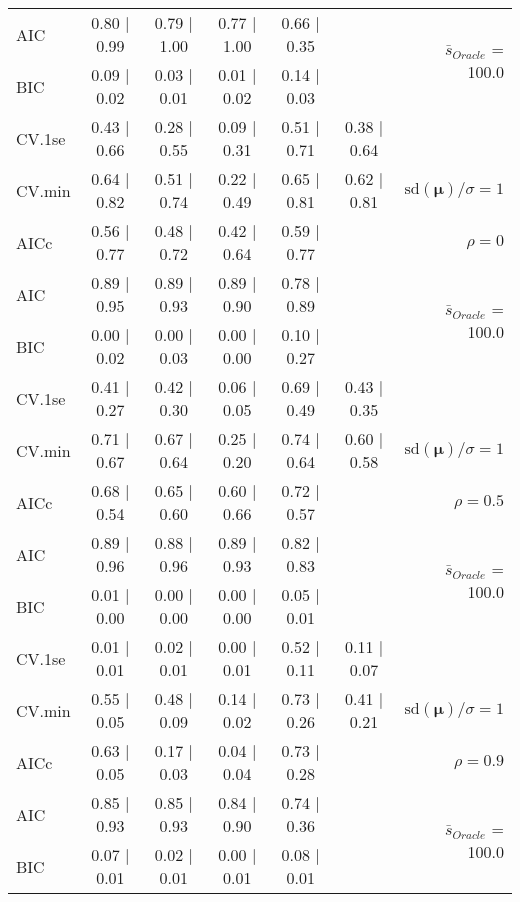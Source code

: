 \begin{table}
\begin{center}
\begin{tabular}{l*{5}{c}|r}
AIC & 0.80 $\mid$ 0.99 & 0.79 $\mid$ 1.00 & 0.77 $\mid$ 1.00 & 0.66 $\mid$ 0.35 & &  \multirow{2}{*}{$\bar{s}_{Oracle}$ = 100.0} \\
BIC & 0.09 $\mid$ 0.02 & 0.03 $\mid$ 0.01 & 0.01 $\mid$ 0.02 & 0.14 $\mid$ 0.03 & &  \\
 \hline 
CV.1se & 0.43 $\mid$ 0.66 & 0.28 $\mid$ 0.55 & 0.09 $\mid$ 0.31 & 0.51 $\mid$ 0.71 & 0.38 $\mid$ 0.64 & \\
CV.min & 0.64 $\mid$ 0.82 & 0.51 $\mid$ 0.74 & 0.22 $\mid$ 0.49 & 0.65 $\mid$ 0.81 & 0.62 $\mid$ 0.81 &  $\mathrm{sd}(\mathbf{\mu})/\sigma=1$ \\
AICc & 0.56 $\mid$ 0.77 & 0.48 $\mid$ 0.72 & 0.42 $\mid$ 0.64 & 0.59 $\mid$ 0.77 & & $\rho=0$ \\
AIC & 0.89 $\mid$ 0.95 & 0.89 $\mid$ 0.93 & 0.89 $\mid$ 0.90 & 0.78 $\mid$ 0.89 & &  \multirow{2}{*}{$\bar{s}_{Oracle}$ = 100.0} \\
BIC & 0.00 $\mid$ 0.02 & 0.00 $\mid$ 0.03 & 0.00 $\mid$ 0.00 & 0.10 $\mid$ 0.27 & &  \\
 \hline 
CV.1se & 0.41 $\mid$ 0.27 & 0.42 $\mid$ 0.30 & 0.06 $\mid$ 0.05 & 0.69 $\mid$ 0.49 & 0.43 $\mid$ 0.35 & \\
CV.min & 0.71 $\mid$ 0.67 & 0.67 $\mid$ 0.64 & 0.25 $\mid$ 0.20 & 0.74 $\mid$ 0.64 & 0.60 $\mid$ 0.58 &  $\mathrm{sd}(\mathbf{\mu})/\sigma=1$ \\
AICc & 0.68 $\mid$ 0.54 & 0.65 $\mid$ 0.60 & 0.60 $\mid$ 0.66 & 0.72 $\mid$ 0.57 & & $\rho=0.5$ \\
AIC & 0.89 $\mid$ 0.96 & 0.88 $\mid$ 0.96 & 0.89 $\mid$ 0.93 & 0.82 $\mid$ 0.83 & &  \multirow{2}{*}{$\bar{s}_{Oracle}$ = 100.0} \\
BIC & 0.01 $\mid$ 0.00 & 0.00 $\mid$ 0.00 & 0.00 $\mid$ 0.00 & 0.05 $\mid$ 0.01 & &  \\
 \hline 
CV.1se & 0.01 $\mid$ 0.01 & 0.02 $\mid$ 0.01 & 0.00 $\mid$ 0.01 & 0.52 $\mid$ 0.11 & 0.11 $\mid$ 0.07 & \\
CV.min & 0.55 $\mid$ 0.05 & 0.48 $\mid$ 0.09 & 0.14 $\mid$ 0.02 & 0.73 $\mid$ 0.26 & 0.41 $\mid$ 0.21 &  $\mathrm{sd}(\mathbf{\mu})/\sigma=1$ \\
AICc & 0.63 $\mid$ 0.05 & 0.17 $\mid$ 0.03 & 0.04 $\mid$ 0.04 & 0.73 $\mid$ 0.28 & & $\rho=0.9$ \\
AIC & 0.85 $\mid$ 0.93 & 0.85 $\mid$ 0.93 & 0.84 $\mid$ 0.90 & 0.74 $\mid$ 0.36 & &  \multirow{2}{*}{$\bar{s}_{Oracle}$ = 100.0} \\
BIC & 0.07 $\mid$ 0.01 & 0.02 $\mid$ 0.01 & 0.00 $\mid$ 0.01 & 0.08 $\mid$ 0.01 & &  \\

\end{tabular}
\end{center}
\end{table}
